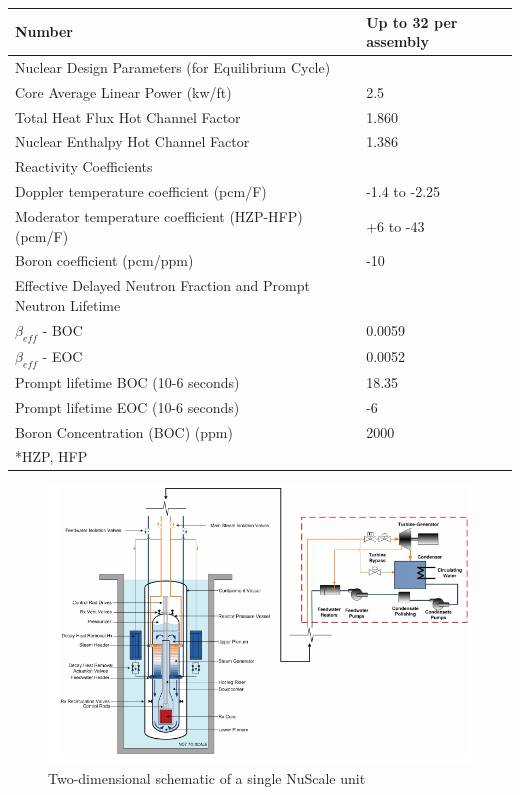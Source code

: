 \begin{table} [htbp]
\begin{center}
\begin{tabular}{l     l}
Number &Up to 32 per assembly\\
\hline 
Nuclear Design Parameters (for Equilibrium Cycle)\\
Core Average Linear Power (kw/ft)&2.5     \\
Total Heat Flux Hot Channel Factor&1.860  \\
Nuclear Enthalpy Hot Channel Factor&1.386  \\
\hline 
Reactivity Coefficients\\
Doppler temperature coefficient (pcm/F)&-1.4 to -2.25\\
Moderator temperature coefficient (HZP-HFP) (pcm/F)&+6 to -43     \\
Boron coefficient (pcm/ppm)&-10             \\
\hline 
Effective Delayed Neutron Fraction 
and Prompt Neutron Lifetime\\
$\beta_{eff}$ - \gls{BOC}&0.0059\\
$ \beta _{eff}$ - \gls{EOC}&0.0052\\
Prompt lifetime BOC (10-6 seconds)&18.35  \\
Prompt lifetime EOC (10-6 seconds)&-6       \\
\hline 
Boron Concentration (BOC) (ppm)&2000\\
\hline 
*\gls{HZP}, \gls{HFP}
\end{tabular}
\end{center}
\end{table}


\begin{figure}[htbp]
\centering
\includegraphics[scale=0.7]{Figs/nuscale2d.jpeg}
\caption{ Two-dimensional schematic of a single NuScale unit}
\label{Nu2d}
\end{figure}

